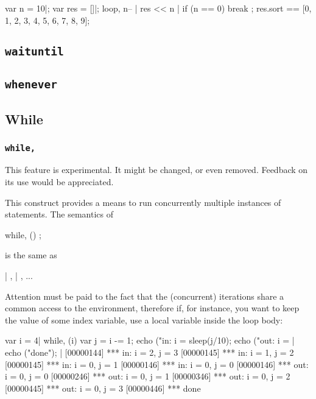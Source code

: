 \begin{urbiassert}[firstnumber=last]
{
  var n = 10|;
  var res = []|;
  loop,
  {
    n-- |
    res << n |
    if (n == 0)
      break
  };
  res.sort
}
==
[0, 1, 2, 3, 4, 5, 6, 7, 8, 9];
\end{urbiassert}

\subsection{\lstinline|waituntil|}
\subsection{\lstinline|whenever|}

\subsection{While}
\subsubsection{\lstinline|while,|}
\label{sec:lang:while:comma}

\begin{note}
  This feature is experimental.  It might be changed, or even removed.
  Feedback on its use would be appreciated.
\end{note}

This construct provides a means to run concurrently multiple instances
of statements.  The semantics of

\begin{urbiunchecked}[frame=, backgroundcolor=, ]
while, ()
  ;
\end{urbiunchecked}

\noindent
is the same as

\begin{urbiunchecked}[frame=, backgroundcolor=, ]
 |  ,  |  , ...
\end{urbiunchecked}

Attention must be paid to the fact that the (concurrent) iterations
share a common access to the environment, therefore if, for instance,
you want to keep the value of some index variable, use a local
variable inside the loop body:

\begin{urbiscript}
{
  var i = 4|
  while, (i)
  {
    var j = i -= 1;
    echo ("in: i = %
    sleep(j/10);
    echo ("out: i = %
  }|
  echo ("done");
}|
[00000144] *** in: i = 2, j = 3
[00000145] *** in: i = 1, j = 2
[00000145] *** in: i = 0, j = 1
[00000146] *** in: i = 0, j = 0
[00000146] *** out: i = 0, j = 0
[00000246] *** out: i = 0, j = 1
[00000346] *** out: i = 0, j = 2
[00000445] *** out: i = 0, j = 3
[00000446] *** done
\end{urbiscript}

